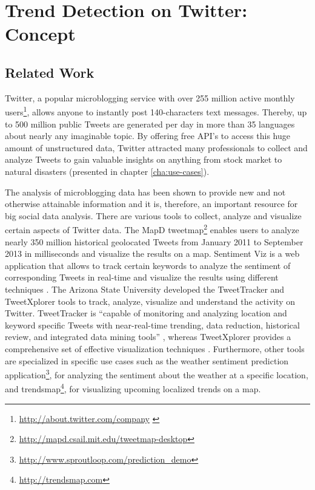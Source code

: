 
\chapter{Trend Detection on Twitter: Concept}
\label{cha:trend-detection-concept}

\section{Related Work}
\label{sec:related-work}
Twitter, a popular microblogging service with over 255 million active monthly users\footnote{\url{http://about.twitter.com/company} \accessednote \label{aboutwitter}}, allows anyone to instantly post 140-characters text messages. Thereby, up to 500 million public Tweets are generated per day in more than 35 languages about nearly any imaginable topic. By offering free API’s to access this huge amount of unstructured data, Twitter attracted many professionals to collect and analyze Tweets to gain valuable insights on anything from stock market to natural disasters (presented in chapter \ref{cha:use-cases}). 

The analysis of microblogging data has been shown to provide new and not otherwise attainable information and it is, therefore, an important resource for big social data analysis. There are various tools to collect, analyze and visualize certain aspects of Twitter data. The MapD tweetmap\footnote{\url{http://mapd.csail.mit.edu/tweetmap-desktop} \accessednote} enables users to analyze nearly 350 million historical geolocated Tweets from January 2011 to September 2013 in milliseconds and visualize the results on a map. Sentiment Viz is a web application that allows to track certain keywords to analyze the sentiment of corresponding Tweets in real-time and visualize the results using different techniques \cite{healy2014twittersentiment}. The Arizona State University developed the TweetTracker and TweetXplorer tools to track, analyze, visualize and understand the activity on Twitter. TweetTracker is \enquote{capable of monitoring and analyzing location and keyword specific Tweets with near-real-time trending, data reduction, historical review, and integrated data mining tools} \cite[1]{kumar2011tweettracker}, whereas TweetXplorer provides a comprehensive set of effective visualization techniques \cite{morstatter2013understanding}. Furthermore, other tools are specialized in specific use cases such as the weather sentiment prediction application\footnote{\url{http://www.sproutloop.com/prediction_demo} \accessednote}, for analyzing  the sentiment about the weather at a specific location, and trendsmap\footnote{\url{http://trendsmap.com} \accessednote}, for visualizing upcoming localized trends on a map.

